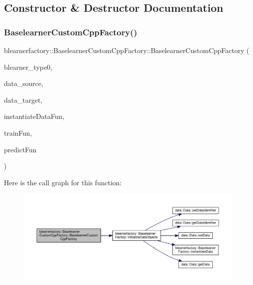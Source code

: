 \subsection{Constructor \& Destructor Documentation}
\mbox{\label{classblearnerfactory_1_1_baselearner_custom_cpp_factory_aede05893f296f7cc4fa07b0601a426e8}} 
\subsubsection{\texorpdfstring{Baselearner\+Custom\+Cpp\+Factory()}{BaselearnerCustomCppFactory()}}
{\footnotesize\ttfamily blearnerfactory\+::\+Baselearner\+Custom\+Cpp\+Factory\+::\+Baselearner\+Custom\+Cpp\+Factory (\begin{DoxyParamCaption}\item[{const std\+::string \&}]{blearner\+\_\+type0,  }\item[{\hyperlink{classdata_1_1_data}{data\+::\+Data} $\ast$}]{data\+\_\+source,  }\item[{\hyperlink{classdata_1_1_data}{data\+::\+Data} $\ast$}]{data\+\_\+target,  }\item[{S\+E\+XP}]{instantiate\+Data\+Fun,  }\item[{S\+E\+XP}]{train\+Fun,  }\item[{S\+E\+XP}]{predict\+Fun }\end{DoxyParamCaption})}

Here is the call graph for this function\+:
\nopagebreak
\begin{figure}[H]
\begin{center}
\leavevmode
\includegraphics[width=350pt]{classblearnerfactory_1_1_baselearner_custom_cpp_factory_aede05893f296f7cc4fa07b0601a426e8_cgraph}
\end{center}
\end{figure}


